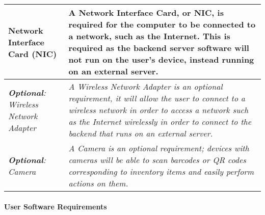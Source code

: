 \documentclass[../../../main.tex]{subfiles}
\begin{document}
\begin{tabular}{ |p{}|p{}| }
    \hline
    Network Interface Card (NIC)                         & A Network Interface Card, or NIC, is required for the computer to be connected to a network, such as the Internet. This is required as the backend server software will not run on the user's device, instead running on an external server.             \\
    \hline
    \textit{\textbf{Optional}: Wireless Network Adapter} & \textit{A Wireless Network Adapter is an optional requirement, it will allow the user to connect to a wireless network in order to access a network such as the Internet wirelessly in order to connect to the backend that runs on an external server.} \\
    \hline
    \textit{\textbf{Optional}: Camera}                   & \textit{A Camera is an optional requirement; devices with cameras will be able to scan barcodes or QR codes corresponding to inventory items and easily perform actions on them.}                                                                        \\
    \hline
\end{tabular}

\pagebreak

\paragraph{User Software Requirements}

\paragraph{} %
\end{document}
